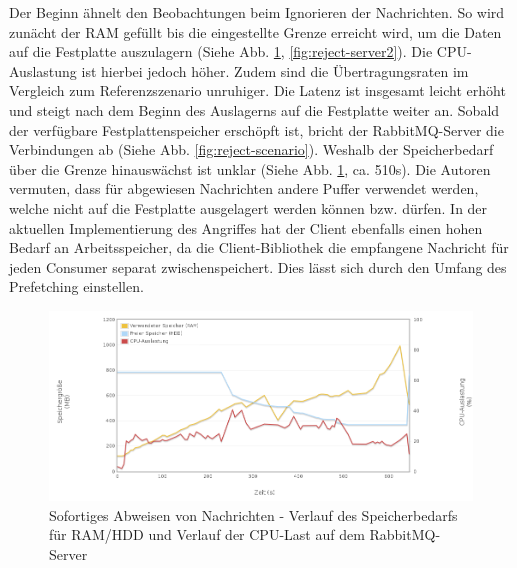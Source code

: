 \documentclass[	a4paper,
			11pt,
			oneside,
			parskip]{scrartcl}
\begin{document}
	
	\clearpage
		{%
		  \newline
		  \newline
		  \newline
		}{%
		 Der Beginn ähnelt den Beobachtungen beim Ignorieren der Nachrichten. So wird zunächt der RAM gefüllt bis die eingestellte Grenze erreicht wird, um die Daten auf die Festplatte auszulagern (Siehe Abb.  \ref{fig:reject-server1}, \ref{fig:reject-server2}).
		 Die CPU-Auslastung ist hierbei jedoch höher. Zudem sind die Übertragungsraten im Vergleich zum Referenzszenario \glqq unruhiger\grqq. Die Latenz ist insgesamt leicht erhöht und steigt nach 
		 dem Beginn des Auslagerns auf die Festplatte weiter an. Sobald der verfügbare Festplattenspeicher erschöpft ist, bricht der RabbitMQ-Server die Verbindungen ab (Siehe Abb. \ref{fig:reject-scenario}).
		 Weshalb der Speicherbedarf über die Grenze hinauswächst ist unklar (Siehe Abb. \ref{fig:reject-server1}, ca. 510s). Die Autoren vermuten, dass für abgewiesen Nachrichten andere Puffer verwendet werden,
		 welche nicht auf die Festplatte ausgelagert werden können bzw. dürfen.
		}{%
		 In der aktuellen Implementierung des Angriffes hat der Client ebenfalls einen hohen Bedarf an Arbeitsspeicher, da die Client-Bibliothek die empfangene Nachricht für jeden Consumer
		 separat zwischenspeichert. Dies lässt sich durch den Umfang des Prefetching einstellen.
		}
		
		\begin{figure}[!htb]
			\centering
			\includegraphics[width=\textwidth]{img/reject/reject_server1.png}
			\caption{Sofortiges Abweisen von Nachrichten - Verlauf des Speicherbedarfs für RAM/HDD und Verlauf der CPU-Last auf dem RabbitMQ-Server}
			\label{fig:reject-server1}
		\end{figure}
		
\end{document}
